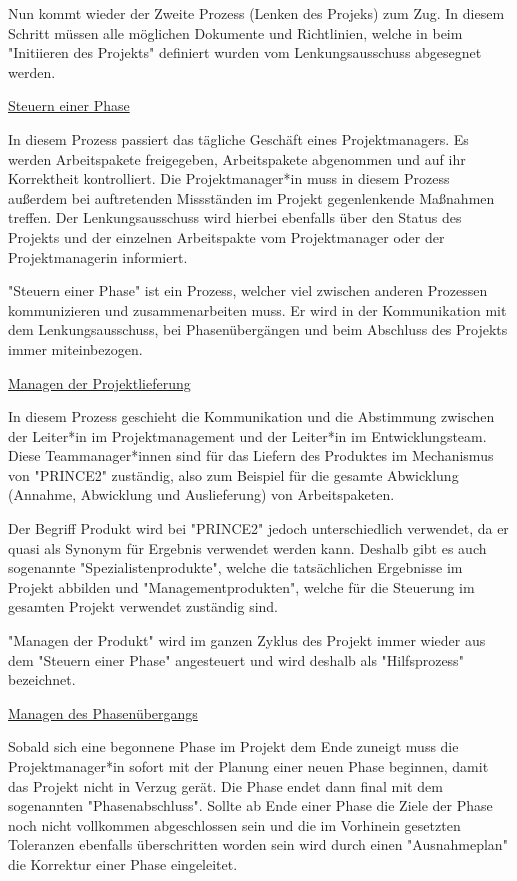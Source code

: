 Nun kommt wieder der Zweite Prozess (Lenken des Projeks) zum Zug. In diesem Schritt müssen alle möglichen Dokumente und Richtlinien, welche in beim "Initiieren des Projekts" definiert wurden vom Lenkungsausschuss abgesegnet werden. \cite{Prince2}

\underline{Steuern einer Phase}

In diesem Prozess passiert das tägliche Geschäft eines Projektmanagers. Es werden Arbeitspakete freigegeben, Arbeitspakete abgenommen und auf ihr Korrektheit kontrolliert. Die Projektmanager*in muss in diesem Prozess außerdem bei auftretenden Missständen im Projekt gegenlenkende Maßnahmen treffen. Der Lenkungsausschuss wird hierbei ebenfalls über den Status des Projekts und der einzelnen Arbeitspakte vom Projektmanager oder der Projektmanagerin informiert. \cite{Prince2}

"Steuern einer Phase" ist ein Prozess, welcher viel zwischen anderen Prozessen kommunizieren und zusammenarbeiten muss. Er wird in der Kommunikation mit dem Lenkungsausschuss, bei Phasenübergängen und beim Abschluss des Projekts immer miteinbezogen. \cite{Prince2}

\underline{Managen der Projektlieferung}

In diesem Prozess geschieht die Kommunikation und die Abstimmung zwischen der Leiter*in im Projektmanagement und der Leiter*in im Entwicklungsteam. Diese Teammanager*innen sind für das Liefern des Produktes im Mechanismus von "PRINCE2" zuständig, also zum Beispiel für die gesamte Abwicklung (Annahme, Abwicklung und Auslieferung) von Arbeitspaketen. \cite{Prince2}

Der Begriff Produkt wird bei "PRINCE2" jedoch unterschiedlich verwendet, da er quasi als Synonym für Ergebnis verwendet werden kann. Deshalb gibt es auch sogenannte "Spezialistenprodukte", welche die tatsächlichen Ergebnisse im Projekt abbilden und "Managementprodukten", welche für die Steuerung im gesamten Projekt verwendet zuständig sind. \cite{Prince2}

"Managen der Produkt" wird im ganzen Zyklus des Projekt immer wieder aus dem "Steuern einer Phase" angesteuert und wird deshalb als "Hilfsprozess" bezeichnet. \cite{Prince2}

\underline{Managen des Phasenübergangs}

Sobald sich eine begonnene Phase im Projekt dem Ende zuneigt muss die Projektmanager*in sofort mit der Planung einer neuen Phase beginnen, damit das Projekt nicht in Verzug gerät. Die Phase endet dann final mit dem sogenannten "Phasenabschluss". Sollte ab Ende einer Phase die Ziele der Phase noch nicht vollkommen abgeschlossen sein und die im Vorhinein gesetzten Toleranzen ebenfalls überschritten worden sein wird durch einen "Ausnahmeplan" die Korrektur einer Phase eingeleitet. \cite{Prince2}

